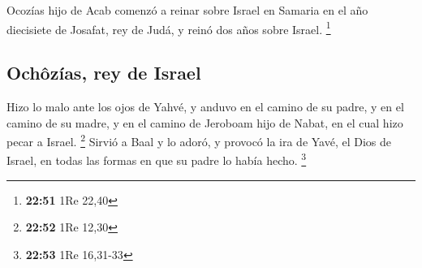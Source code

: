  Ocozías hijo de Acab comenzó a reinar sobre Israel en
Samaria en el año diecisiete de Josafat, rey de Judá, y reinó dos años
sobre Israel. \footnote{\textbf{22:51} 1Re 22,40}

\hypertarget{ochuxf4zuxedas-rey-de-israel}{%
\subsection{Ochôzías, rey de
Israel}\label{ochuxf4zuxedas-rey-de-israel}}

 Hizo lo malo ante los ojos de Yahvé, y anduvo en el
camino de su padre, y en el camino de su madre, y en el camino de
Jeroboam hijo de Nabat, en el cual hizo pecar a Israel. \footnote{\textbf{22:52}
  1Re 12,30}  Sirvió a Baal y lo adoró, y provocó la ira
de Yavé, el Dios de Israel, en todas las formas en que su padre lo había
hecho. \footnote{\textbf{22:53} 1Re 16,31-33}
